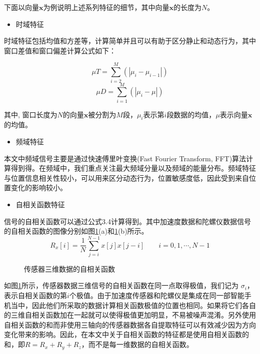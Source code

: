 下面以向量$\textbf{x}$为例说明上述系列特征的细节，其中向量$\textbf{x}$的长度为$N$。
\begin{itemize}
	\item 时域特征
\end{itemize}
\par 时域特征包括均值和方差等，计算简单并且可以有助于区分静止和动态行为\cite{positionClassifier}，其中窗口差值和窗口偏差计算公式如下：

\begin{equation}
	\mu T = \sum_{i=2}^{M}(|\mu_i - \mu_{i-1}|)
\end{equation}
\begin{equation}
	\mu D = \sum_{i=1}^{M}(|\mu_i - \mu|)
\end{equation}

其中, 窗口长度为$N$的向量$\textbf{x}$被分割为$M$段，$\mu_i$表示第$i$段数据的均值，$\mu$表示向量$\textbf{x}$的均值。

\begin{itemize}
	\item 频域特征
\end{itemize}

\par 本文中频域信号主要是通过快速傅里叶变换(Fast Fourier Transform, FFT)算法计算得到得。在频域中，我们重点关注最大频域分量以及频域的能量分布。频域特征与位置信息相关性较小，可以用来区分动态行为，位置敏感度低，因此受到来自位置变化的影响较小。
\begin{itemize}
	\item 自相关函数特征
\end{itemize}
\par 信号的自相关函数可以通过公式3.4计算得到。其中加速度数据和陀螺仪数据信号的自相关函数的图像分别如图\ref{three_dimen}(a)和\ref{three_dimen}(b)所示。
\begin{equation}
	R_x[i]=\frac{1}{N}\sum_{j=i}^{N-1} x[j]x[j-i]\qquad  i=0, 1, \cdots, N-1
\end{equation}
\begin{figure}[!htb]
    \centering
    \caption{传感器三维数据的自相关函数} \label{three_dimen}
\end{figure}

\par 如图\ref{three_dimen}所示，传感器数据三维信号的自相关函数在同一点取得极值，我们记为 $\sigma_i$，表示自相关函数的第$i$个极值。由于加速度传感器和陀螺仪是集成在同一部智能手机当中，因此他们所采取的数据计算相关函数极值的位置也相同。如果将它们各自的三维自相关函数加在一起就可以使得极值更加明显，不易被噪声混淆。另外使用自相关函数的和而非使用三轴向的传感器数据各自提取特征可以有效减少因为方向变化带来的影响。因此，在本文中关于自相关函数的特征都是使用自相关函数的和，即$R = R_x + R_y + R_z$，而不是每一维数据的自相关函数。

